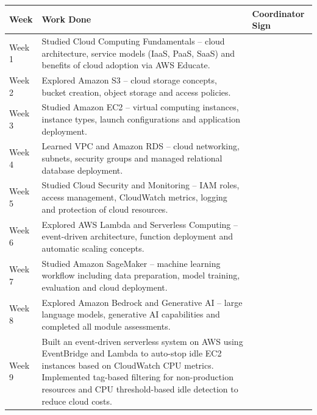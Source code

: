 \documentclass[12pt, a4paper, oneside]{report}
\begin{document}
\begin{center}
\small
\begin{tabular}{|p{1.2cm}|p{9cm}|p{2.8cm}|}
    \hline
    \textbf{Week} & \textbf{Work Done} & \textbf{Coordinator Sign} \\
    \hline
    Week 1 & Studied Cloud Computing Fundamentals -- cloud architecture, service models (IaaS, PaaS, SaaS) and benefits of cloud adoption via AWS Educate. & \\[0.4cm]
    \hline
    Week 2 & Explored Amazon S3 -- cloud storage concepts, bucket creation, object storage and access policies. & \\[0.4cm]
    \hline
    Week 3 & Studied Amazon EC2 -- virtual computing instances, instance types, launch configurations and application deployment. & \\[0.4cm]
    \hline
    Week 4 & Learned VPC and Amazon RDS -- cloud networking, subnets, security groups and managed relational database deployment. & \\[0.4cm]
    \hline
    Week 5 & Studied Cloud Security and Monitoring -- IAM roles, access management, CloudWatch metrics, logging and protection of cloud resources. & \\[0.4cm]
    \hline
    Week 6 & Explored AWS Lambda and Serverless Computing -- event-driven architecture, function deployment and automatic scaling concepts. & \\[0.4cm]
    \hline
    Week 7 & Studied Amazon SageMaker -- machine learning workflow including data preparation, model training, evaluation and cloud deployment. & \\[0.4cm]
    \hline
    Week 8 & Explored Amazon Bedrock and Generative AI -- large language models, generative AI capabilities and completed all module assessments. & \\[0.4cm]
    \hline
    Week 9 & Built an event-driven serverless system on AWS using EventBridge and Lambda to auto-stop idle EC2 instances based on CloudWatch CPU metrics. Implemented tag-based filtering for non-production resources and CPU threshold-based idle detection to reduce cloud costs. & \\[0.4cm]
    \hline
\end{tabular}
\end{center}
\end{document}
